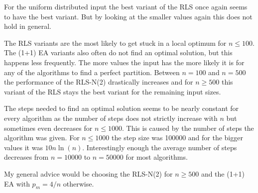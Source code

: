 For the uniform distributed input the best variant of the RLS once again seems to have the best variant.
But by looking at the smaller values again this does not hold in general.



The RLS variants are the most likely to get stuck in a local optimum for $n\le100$. The (1+1) EA variants also often do not find an optimal solution, but this happens less frequently. The more values the input has the more likely it is for any of the algorithms to find a perfect partition. Between $n=100$ and $n=500$ the performance of the RLS-N(2) drastically increases and for $n\ge500$ this variant of the RLS stays the best variant for the remaining input sizes.



The steps needed to find an optimal solution seems to be nearly constant for every algorithm as the number of steps does not strictly increase with $n$ but sometimes even decreases for $n\le1000$.
This is caused by the number of steps the algorithm was given.
For $n\le1000$ the step size was 100000 and for the bigger values it was $10n\ln(n)$.
Interestingly enough the average number of steps decreases from $n=10000$ to $n=50000$ for most algorithms.



My general advice would be choosing the RLS-N(2) for $n\ge500$ and the (1+1) EA with $p_m=4/n$ otherwise.